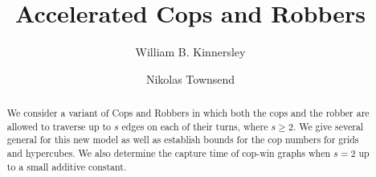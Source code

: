 \documentclass[12pt]{amsart}
\theoremstyle{definition}
\begin{document}
\title{Accelerated Cops and Robbers}

\author{William B. Kinnersley}
\address{Department of Mathematics and Applied Mathematical Sciences, University of Rhode Island, University of Rhode Island, Kingston, RI, USA, 02881}

\author{Nikolas Townsend}


\address{Department of Mathematics, University of Massachusetts Boston, Wheatley Hall, 100 William T Morrissey Blvd, Boston, MA 02125}


\begin{abstract} We consider a variant of Cops and Robbers in which both the cops and the robber are allowed to traverse up to $s$ edges on each of their turns, where $s\ge 2$.  We give several general for this new model as well as establish bounds for the cop numbers for grids and hypercubes.  We also determine the capture time of cop-win graphs when $s=2$ up to a small additive constant. \end{abstract}

\maketitle
\end{document}
